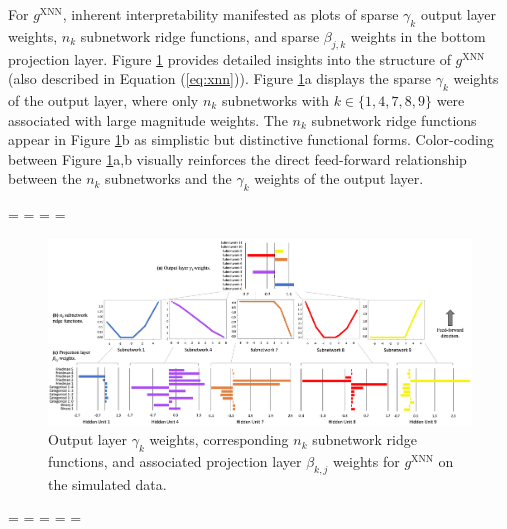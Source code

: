 \documentclass[information,article,accept,moreauthors,pdftex]{Definitions/mdpi}
\begin{document}
For $g^\text{XNN}$, inherent interpretability manifested as plots of sparse $\gamma_k$ output layer weights, $n_k$ subnetwork ridge functions, and sparse $\beta_{j,k}$ weights in the bottom projection layer. Figure \ref{fig:sim_xnn_glob_ridge} provides detailed insights into the structure of $g^\text{XNN}$ (also described in Equation (\ref{eq:xnn})). Figure \ref{fig:sim_xnn_glob_ridge}{a} displays the sparse $\gamma_k$ weights of the output layer, where only $n_k$ subnetworks with $k \in \{1, 4, 7, 8, 9\}$ were associated with large magnitude weights. The $n_k$ subnetwork ridge functions appear in Figure \ref{fig:sim_xnn_glob_ridge}{b} as simplistic but distinctive functional forms. Color-coding between Figure \ref{fig:sim_xnn_glob_ridge}{a},{b} visually reinforces the direct feed-forward relationship between the $n_k$ subnetworks and the $\gamma_k$ weights of the output layer.%

\newpage
\paperwidth=\pdfpageheight
\paperheight=\pdfpagewidth
\pdfpageheight=\paperheight
\pdfpagewidth=\paperwidth
{}
\fancyheadoffset[LO,RE]{0cm}
\fancyheadoffset[RO,LE]{0cm}

\begin{figure}[H]
\centering
	\includegraphics[width=23cm]{img/sim_xnn_glob_ridge.png}
	\caption{Output layer $\gamma_k$ weights, corresponding $n_k$ subnetwork ridge functions, and associated projection layer $\beta_{k,j}$ weights for $g^\text{XNN}$ on the simulated data.}
	\label{fig:sim_xnn_glob_ridge}
\end{figure} 

\newpage
\restoregeometry
\paperwidth=\pdfpageheight
\paperheight=\pdfpagewidth
\pdfpageheight=\paperheight
\pdfpagewidth=\paperwidth
\headwidth=\textwidth
\end{document}
